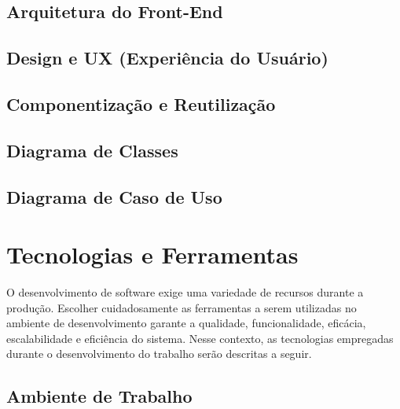 \subsection{Arquitetura do Front-End}


\subsection{Design e UX (Experiência do Usuário)}


\subsection{Componentização e Reutilização}


\subsection{Diagrama de Classes}

\subsection{Diagrama de Caso de Uso}


\section{Tecnologias e Ferramentas}

O desenvolvimento de software exige uma variedade de recursos durante a produção. Escolher cuidadosamente as ferramentas a serem utilizadas no ambiente de desenvolvimento garante a qualidade, funcionalidade, eficácia, escalabilidade e eficiência do sistema. Nesse contexto, as tecnologias empregadas durante o desenvolvimento do trabalho serão descritas a seguir. 

\subsection{Ambiente de Trabalho}

